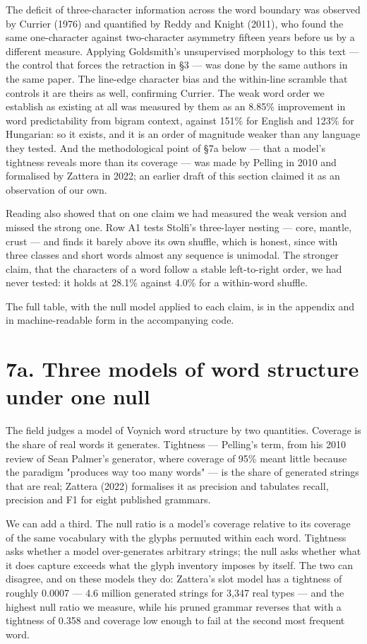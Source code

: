 \documentclass[11pt,a4paper]{article}
\begin{document}
The deficit of three-character information across the word boundary was observed by Currier (1976) and quantified by Reddy and Knight (2011), who found the same one-character against two-character asymmetry fifteen years before us by a different measure. Applying Goldsmith's unsupervised morphology to this text --- the control that forces the retraction in \S3 --- was done by the same authors in the same paper. The line-edge character bias and the within-line scramble that controls it are theirs as well, confirming Currier. The weak word order we establish as existing at all was measured by them as an 8.85\% improvement in word predictability from bigram context, against 151\% for English and 123\% for Hungarian: so it exists, and it is an order of magnitude weaker than any language they tested. And the methodological point of \S7a below --- that a model's tightness reveals more than its coverage --- was made by Pelling in 2010 and formalised by Zattera in 2022; an earlier draft of this section claimed it as an observation of our own.


Reading also showed that on one claim we had measured the weak version and missed the strong one. Row A1 tests Stolfi's three-layer nesting --- core, mantle, crust --- and finds it barely above its own shuffle, which is honest, since with three classes and short words almost any sequence is unimodal. The stronger claim, that the characters of a word follow a stable left-to-right order, we had never tested: it holds at 28.1\% against 4.0\% for a within-word shuffle.


The full table, with the null model applied to each claim, is in the appendix and in machine-readable form in the accompanying code.


\section*{7a. Three models of word structure under one null}


The field judges a model of Voynich word structure by two quantities. Coverage is the share of real words it generates. Tightness --- Pelling's term, from his 2010 review of Sean Palmer's generator, where coverage of 95\% meant little because the paradigm "produces way too many words" --- is the share of generated strings that are real; Zattera (2022) formalises it as precision and tabulates recall, precision and F1 for eight published grammars.


We can add a third. The null ratio is a model's coverage relative to its coverage of the same vocabulary with the glyphs permuted within each word. Tightness asks whether a model over-generates arbitrary strings; the null asks whether what it does capture exceeds what the glyph inventory imposes by itself. The two can disagree, and on these models they do: Zattera's slot model has a tightness of roughly 0.0007 --- 4.6 million generated strings for 3,347 real types --- and the highest null ratio we measure, while his pruned grammar reverses that with a tightness of 0.358 and coverage low enough to fail at the second most frequent word.
\end{document}
